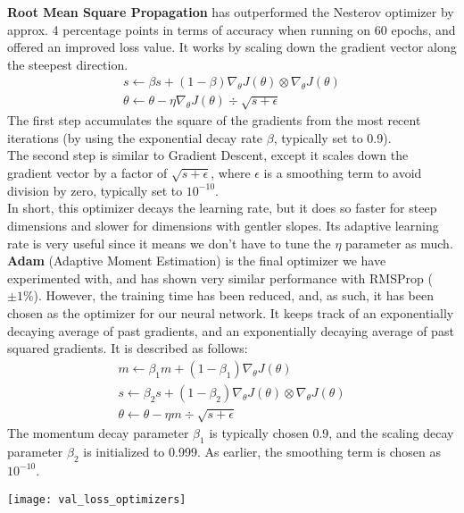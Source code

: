\textbf{Root Mean Square Propagation} has outperformed the Nesterov optimizer by approx. 4 percentage points in terms of accuracy when running on 60 epochs, and offered an improved loss value. It works by scaling down the gradient vector along the steepest direction.
\begin{gather}
s \leftarrow \beta s + (1 - \beta) \nabla_\theta J(\theta) \otimes \nabla_\theta J(\theta) \\
\theta \leftarrow \theta - \eta \nabla_\theta J(\theta) \div \sqrt{s+\epsilon}
\end{gather}
The first step accumulates the square of the gradients from the most recent iterations (by using the exponential decay rate $\beta$, typically set to 0.9). \\
The second step is similar to Gradient Descent, except it scales down the gradient vector by a factor of $\sqrt{s+\epsilon}$, where $\epsilon$ is a smoothing term to avoid division by zero, typically set to $10^{-10}$.\\
In short, this optimizer decays the learning rate, but it does so faster for steep dimensions and slower for dimensions with gentler slopes. Its adaptive learning rate is very useful since it means we don't have to tune the $\eta$ parameter as much.\\
\textbf{Adam} (Adaptive Moment Estimation) is the final optimizer we have experimented with, and has shown very similar performance with RMSProp ($\pm{1\%}$). However, the training time has been reduced, and, as such, it has been chosen as the optimizer for our neural network. It keeps track of an exponentially decaying average of past gradients, and an exponentially decaying average of past squared gradients. It is described as follows:
\begin{gather}
m \leftarrow \beta_1 m + (1-\beta_1) \nabla_\theta J(\theta) \\
s \leftarrow \beta_2 s + (1-\beta_2) \nabla_\theta J(\theta) \otimes \nabla_\theta J(\theta)\\
\theta \leftarrow \theta - \eta m \div \sqrt{s + \epsilon}
\end{gather}
The momentum decay parameter $\beta_1$ is typically chosen 0.9, and the scaling decay parameter $\beta_2$ is initialized to 0.999. As earlier, the smoothing term is chosen as $10^{-10}$.
\begin{center}
\texttt{[image: val\_loss\_optimizers]}
\end{center}
